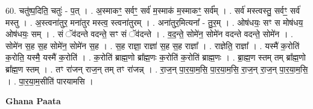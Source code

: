 \documentclass[17pt]{extarticle}
\begin{document}
60. चतु॑ष्प॒दिति॒ चतुः॑ - प॒त् । . अ॒स्माकꣳ॒॒ सर्वꣳ॒॒ सर्व॑ म॒स्माक॑ म॒स्माकꣳ॒॒ सर्व᳚म् । . सर्व॑ मस्त्वस्तु॒ सर्वꣳ॒॒ सर्व॑ मस्तु । . अ॒स्त्वना॑तुर॒ मना॑तुर मस्त्व॒ स्त्वना॑तुरम् । . अना॑तुर॒मित्यना᳚ - तु॒र॒म् । . ओष॑धयः॒ सꣳ स मोष॑धय॒ ओष॑धयः॒ सम् । . सं ॅव॑दन्ते वदन्ते॒ सꣳ सं ॅव॑दन्ते । . व॒द॒न्ते॒ सोमे॑न॒ सोमे॑न वदन्ते वदन्ते॒ सोमे॑न । . सोमे॑न स॒ह स॒ह सोमे॑न॒ सोमे॑न स॒ह । . स॒ह राज्ञा॒ राज्ञा॑ स॒ह स॒ह राज्ञा᳚ । . राज्ञेति॒ राज्ञा᳚ । . यस्मै॑ क॒रोति॑ क॒रोति॒ यस्मै॒ यस्मै॑ क॒रोति॑ । . क॒रोति॑ ब्राह्म॒णो ब्रा᳚ह्म॒णः क॒रोति॑ क॒रोति॑ ब्राह्म॒णः । . ब्रा॒ह्म॒ण स्तम् तम् ब्रा᳚ह्म॒णो ब्रा᳚ह्म॒ण स्तम् । . तꣳ रा॑जन् राज॒न् तम् तꣳ रा॑जन्न् । . रा॒ज॒न् पा॒र॒या॒म॒सि॒ पा॒र॒या॒म॒सि॒ रा॒ज॒न् रा॒ज॒न् पा॒र॒या॒म॒सि॒ । . पा॒र॒या॒म॒सीति॑ पारयामसि । \newline

\textbf{Ghana Paata } \newline
\end{document}

